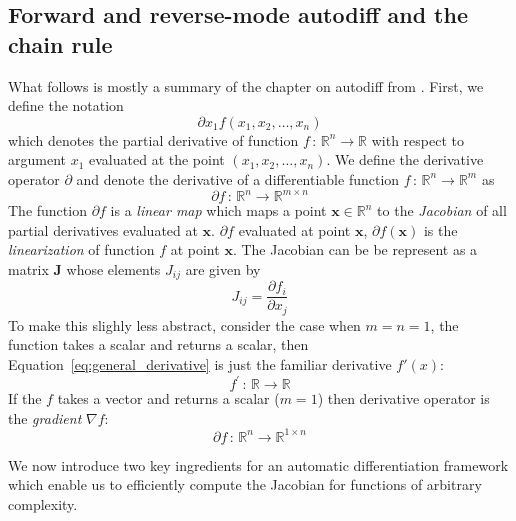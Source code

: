 \documentclass[12pt,dvipsnames]{report}
\renewcommand{\vec}[1]{\boldsymbol{\mathbf{#1}}}
\begin{document}
\subsection{Forward and reverse-mode autodiff and the chain rule}
What follows is mostly a summary of the chapter on autodiff 
from \citet{murphy_book_2023}. First, we define the notation
\begin{equation}
\partial x_1 f\left(x_{1}, x_{2}, \ldots, x_{n}\right)
\end{equation} 
which denotes the partial derivative of function 
$f\,:\,\mathbb{R}^{n} \rightarrow \mathbb{R}$ with respect to argument $x_1$ 
evaluated at the point $(x_{1}, x_{2}, \ldots, x_{n})$.
We define the derivative operator $\partial$ and denote the derivative of a 
differentiable function $f\,:\,\mathbb{R}^{n} \rightarrow \mathbb{R}^m$ as 
\begin{equation}
    \partial f\,:\,\mathbb{R}^{n} \rightarrow \mathbb{R}^{m\times n}
    \label{eq:general_derivative}
\end{equation}
The function $\partial f$ is a \textsl{linear map} which maps a point 
$\vec x\in \mathbb{R}^n$ to the \textsl{Jacobian} of all partial derivatives 
evaluated at $\vec x$.  $\partial f$ evaluated at point $\vec x$,
$\partial f (\vec x)$ is the \textsl{linearization} of function $f$ at point $\vec x$.
The Jacobian can be be represent as a matrix $\vec J$ whose 
elements $J_{ij}$ are given by 
\begin{equation}
J_{i j}=\frac{\partial f_{i}}{\partial x_{j}}
\end{equation}
  To make this slighly less abstract, consider the case when
$m=n=1$, the function takes a scalar and returns a scalar, then 
Equation~\ref{eq:general_derivative} is just the familiar derivative $f'(x)$:
\begin{equation}
    f^\prime\,:\,\mathbb{R} \rightarrow \mathbb{R}
\end{equation}
If the $f$ takes a vector and returns a scalar ($m=1$) then derivative operator is 
the \textsl{gradient} $\nabla f$:
\begin{equation}
    \partial f\,:\,\mathbb{R}^{n} \rightarrow \mathbb{R}^{1\times n}
\end{equation}

We now introduce two key ingredients for an automatic differentiation framework 
which enable us to efficiently compute the Jacobian for functions of arbitrary 
complexity.
\end{document}
